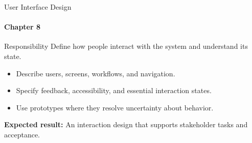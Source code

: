 \begin{frame}{User Interface Design}
\framesubtitle{Chapter 8}
\begin{block}{Responsibility}
Define how people interact with the system and understand its state.
\end{block}
\begin{itemize}
  \item Describe users, screens, workflows, and navigation.
  \item Specify feedback, accessibility, and essential interaction states.
  \item Use prototypes where they resolve uncertainty about behavior.
\end{itemize}
\vspace{0.15cm}
\textbf{Expected result:} An interaction design that supports stakeholder tasks and acceptance.
\end{frame}
